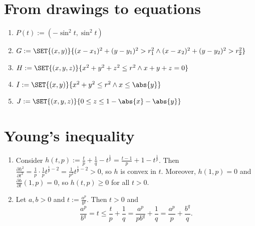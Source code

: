 \documentclass{article}
\begin{document}
\begin{enumerate}
\begin{minipage}[t]{0.45\textwidth}
    \end{minipage}
    \end{enumerate}


\section{From drawings to equations}
\begin{enumerate}
    \item $P(t) := (- \sin^2 t, \sin^2 t)$
    \item $G := \SET{(x, y)}{(x - x_1)^2 + (y - y_1)^2 > r_1^2 \wedge (x - x_2)^2 + (y - y_2)^2 > r_2^2}$
    \item $H := \SET{(x, y, z)}{x^2 + y^2 + z^2 \leq r^2 \wedge x + y + z = 0}$
    \item $I := \SET{(x, y)}{x^2 + y^2 \leq r^2 \wedge x \leq \abs{y}}$
    \item $J := \SET{(x, y, z)}{0 \leq z \leq 1 - \abs{x} - \abs{y}}$
\end{enumerate}

\section{Young's inequality}
\begin{enumerate}
    \item Consider $h(t, p) := \frac{t}{p} + \frac{1}{q} - t^{\frac{1}{p}} 
    = \frac{t - 1}{p} + 1 - t^{\frac{1}{p}}$. 
    Then $\frac{\partial h^2}{\partial t^2} = \frac{1}{p} \cdot \frac{1}{p} t^{\frac{1}{p} - 2} = \frac{1}{p^2} t^{\frac{1}{p} - 2} > 0$, so $h$ is convex in $t$. Moreover, $h(1, p) = 0$ and $\frac{\partial h}{\partial t}(1, p) = 0$, so $h(t, p) \geq 0$ for all $t > 0$.

    \item Let $a, b > 0$ and $t := \frac{a^p}{b^q}$. Then $t > 0$ and
    \[\frac{a^p}{b^q} = t \leq \frac{t}{p} + \frac{1}{q} = \frac{a^p}{p b^q} + \frac{1}{q} = \frac{a^p}{p} + \frac{b^q}{q}.\]    
\end{enumerate}
\end{document}
